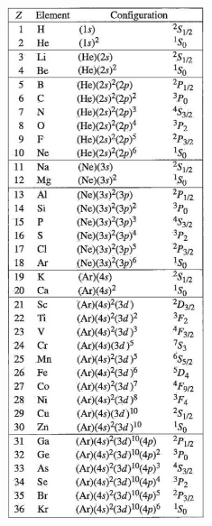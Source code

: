 \documentclass[a4paper, 9pt]{extarticle}
\begin{document}
\begin{center}
	\includegraphics[height=15cm]{groundStateElectronConfigurations}
\end{center}
\end{document}
